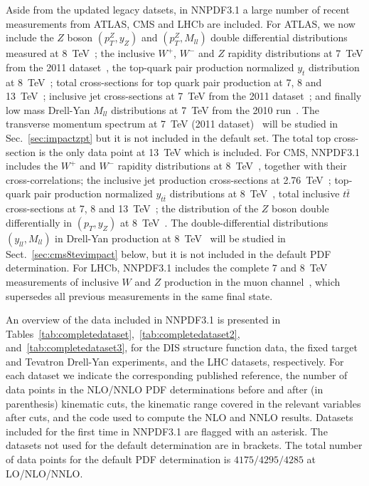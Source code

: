 Aside from the updated legacy datsets, in NNPDF3.1 a large number of recent measurements from ATLAS, CMS and LHCb are included.
%
For ATLAS, we now include the $Z$ boson $(p_T^Z,y_Z)$ and $(p_T^Z,M_{ll})$ double differential distributions measured at 8~TeV~\cite{Aad:2015auj}; the inclusive $W^+$, $W^-$ and $Z$ rapidity distributions at 
7~TeV from the 2011 dataset~\cite{Aaboud:2016btc}, the top-quark pair production normalized $y_t$ distribution at 8~TeV~\cite{Aad:2015mbv}; total cross-sections for top quark pair production at 7, 8 and 13~TeV~\cite{Aad:2014kva,Aaboud:2016pbd}; inclusive jet cross-sections at 7~TeV from the 2011 dataset~\cite{Aad:2014vwa}; and 
finally low mass Drell-Yan $M_{ll}$ distributions at 7~TeV from the 2010 run~\cite{Aad:2014qja}. The transverse momentum 
spectrum at 7~TeV (2011 dataset)~\cite{Aad:2014xaa} will be studied in Sec.~\ref{sec:impactzpt} but it is not included in the default 
set. The total top cross-section is the only data point at 13~TeV which
is included.
For CMS, NNPDF3.1 includes the $W^+$ and $W^-$ rapidity distributions at 8~TeV~\cite{Khachatryan:2016pev},
together with their cross-correlations; the inclusive jet production
cross-sections at 2.76~TeV~\cite{Khachatryan:2015luy};
top-quark pair production normalized $y_{t\bar{t}}$ distributions at 8~TeV~\cite{Khachatryan:2015oqa}, total inclusive $t\bar{t}$ cross-sections at 7, 8
and 13~TeV~\cite{Khachatryan:2016mqs}; the distribution of the
$Z$ boson double differentially in $(p_T,y_Z)$ at 8~TeV~\cite{Khachatryan:2015oaa}. The double-differential
distributions $(y_{ll},M_{ll})$ in Drell-Yan production at 8~TeV~\cite{CMS:2014jea} will be studied in
Sect.~\ref{sec:cms8tevimpact} below, but it is not included in the default
PDF determination.
For LHCb, NNPDF3.1 includes the
complete 7 and 8~TeV measurements of inclusive $W$ and $Z$
production in the muon
channel~\cite{Aaij:2015gna,Aaij:2015zlq}, which supersedes all previous
measurements in the same final state.

An overview of the data included in NNPDF3.1 is presented in
Tables~\ref{tab:completedataset},~\ref{tab:completedataset2},
and~\ref{tab:completedataset3}, for the DIS structure function data,
the fixed target and Tevatron Drell-Yan experiments, and the LHC
datasets, respectively.
%
For each dataset we indicate the corresponding published reference, the number
of data points in the NLO/NNLO PDF determinations 
before and after (in parenthesis) kinematic cuts, the kinematic
range covered in the relevant variables after cuts, and the code used
to compute the NLO and NNLO results.
%
Datasets included 
for the first time in NNPDF3.1 are flagged with an asterisk. The
datasets not used for the default determination are in brackets. 
The total number of data points for the default
PDF determination 
is $4175/4295/4285$ at LO/NLO/NNLO.


